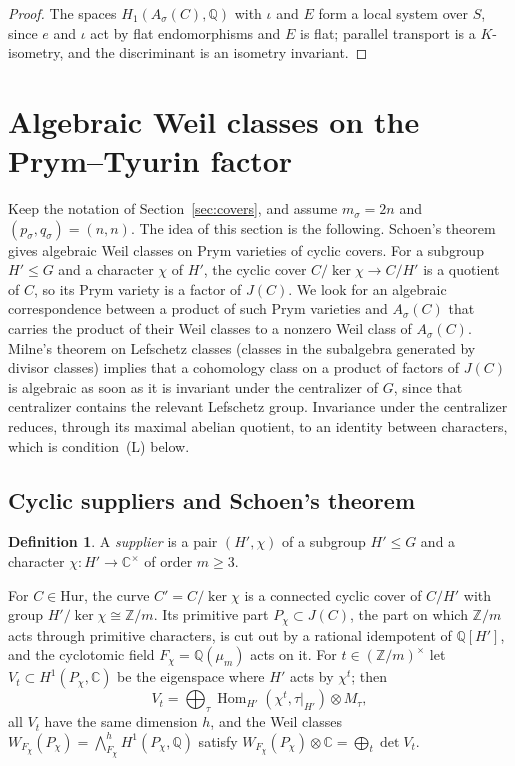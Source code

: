 \documentclass[11pt]{amsart}
\theoremstyle{definition}
\newtheorem{definition}[theorem]{Definition}
\theoremstyle{remark}
\newcommand{\Q}{\mathbb Q}
\newcommand{\Z}{\mathbb Z}
\newcommand{\C}{\mathbb C}
\newcommand{\Hom}{\operatorname{Hom}}
\newcommand{\cH}{\mathrm{Hur}}
\begin{document}
\begin{proof}
The spaces $H_1(A_\sigma(C),\Q)$ with $\iota$ and $E$ form a local system over $S$, since $e$ and $\iota$ act by flat endomorphisms and $E$ is flat; parallel transport is a $K$-isometry, and the discriminant is an isometry invariant.
\end{proof}

\section{Algebraic Weil classes on the Prym--Tyurin factor}\label{sec:supply}

Keep the notation of Section~\ref{sec:covers}, and assume $m_\sigma=2n$ and $(p_\sigma,q_\sigma)=(n,n)$. The idea of this section is the following. Schoen's theorem gives algebraic Weil classes on Prym varieties of cyclic covers. For a subgroup $H'\le G$ and a character $\chi$ of $H'$, the cyclic cover $C/\ker\chi\to C/H'$ is a quotient of $C$, so its Prym variety is a factor of $J(C)$. We look for an algebraic correspondence between a product of such Prym varieties and $A_\sigma(C)$ that carries the product of their Weil classes to a nonzero Weil class of $A_\sigma(C)$. Milne's theorem on Lefschetz classes (classes in the subalgebra generated by divisor classes) implies that a cohomology class on a product of factors of $J(C)$ is algebraic as soon as it is invariant under the centralizer of $G$, since that centralizer contains the relevant Lefschetz group. Invariance under the centralizer reduces, through its maximal abelian quotient, to an identity between characters, which is condition~(L) below.

\subsection{Cyclic suppliers and Schoen's theorem}
\begin{definition}\label{def:supplier}
A \emph{supplier} is a pair $(H',\chi)$ of a subgroup $H'\le G$ and a character $\chi\colon H'\to\C^\times$ of order $m\ge3$.
\end{definition}

For $C\in\cH$, the curve $C'=C/\ker\chi$ is a connected cyclic cover of $C/H'$ with group $H'/\ker\chi\cong\Z/m$. Its primitive part $P_\chi\subset J(C)$, the part on which $\Z/m$ acts through primitive characters, is cut out by a rational idempotent of $\Q[H']$, and the cyclotomic field $F_\chi=\Q(\mu_m)$ acts on it. For $t\in(\Z/m)^\times$ let $V_t\subset H^1(P_\chi,\C)$ be the eigenspace where $H'$ acts by $\chi^t$; then
\[
V_t=\bigoplus_\tau\Hom_{H'}(\chi^t,\tau|_{H'})\otimes M_\tau,
\]
all $V_t$ have the same dimension $h$, and the Weil classes $W_{F_\chi}(P_\chi)=\bigwedge^h_{F_\chi}H^1(P_\chi,\Q)$ satisfy $W_{F_\chi}(P_\chi)\otimes\C=\bigoplus_t\det V_t$.
\end{document}
